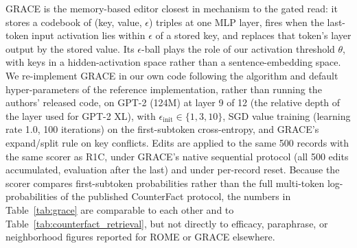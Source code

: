 \documentclass[preprint,12pt]{elsarticle}
\begin{document}
GRACE \cite{hartvigsen2023aging} is the memory-based editor closest in mechanism to the gated read: it stores a codebook of (key, value, $\epsilon$) triples at one MLP layer, fires when the last-token input activation lies within $\epsilon$ of a stored key, and replaces that token's layer output by the stored value. Its $\epsilon$-ball plays the role of our activation threshold $\theta$, with keys in a hidden-activation space rather than a sentence-embedding space. We re-implement GRACE in our own code following the algorithm and default hyper-parameters of the reference implementation, rather than running the authors' released code, on GPT-2 (124M) at layer 9 of 12 (the relative depth of the layer used for GPT-2 XL), with $\epsilon_{\mathrm{init}}\in\{1,3,10\}$, SGD value training (learning rate 1.0, 100 iterations) on the first-subtoken cross-entropy, and GRACE's expand/split rule on key conflicts. Edits are applied to the same 500 records with the same scorer as R1C, under GRACE's native sequential protocol (all 500 edits accumulated, evaluation after the last) and under per-record reset. Because the scorer compares first-subtoken probabilities rather than the full multi-token log-probabilities of the published CounterFact protocol, the numbers in Table~\ref{tab:grace} are comparable to each other and to Table~\ref{tab:counterfact_retrieval}, but not directly to efficacy, paraphrase, or neighborhood figures reported for ROME or GRACE elsewhere.
\end{document}

